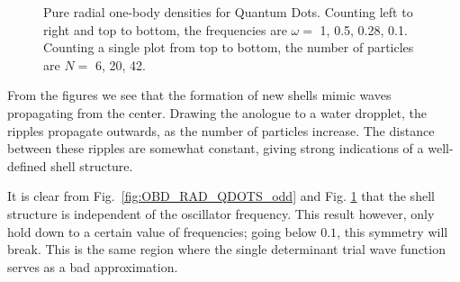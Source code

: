 \begin{figure}
\begin{center}
  \caption{Pure radial one-body densities for Quantum Dots. Counting left to right and top to bottom, the frequencies are $\omega=$ 1, 0.5, 0.28, 0.1. Counting a single plot from top to bottom, the number of particles are $N=$ 6, 20, 42.}
  \label{fig:OBD_RAD_QDOTS_even}
 \end{center}
\end{figure}
\normalsize
\clearpage

From the figures we see that the formation of new shells mimic waves propagating from the center. Drawing the anologue to a water dropplet, the ripples propagate outwards, as the number of particles increase. The distance between these ripples are somewhat constant, giving strong indications of a well-defined shell structure.

It is clear from Fig.~\ref{fig:OBD_RAD_QDOTS_odd} and Fig. \ref{fig:OBD_RAD_QDOTS_even} that the shell structure is independent of the oscillator frequency. This result however, only hold down to a certain value of frequencies; going below $0.1$, this symmetry will break. This is the same region where the single determinant trial wave function serves as a bad approximation.
 
 



